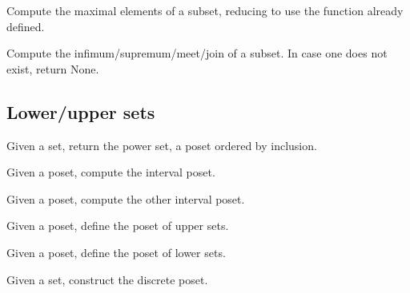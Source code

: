 \begin{exercise}
Compute the maximal elements of a subset, reducing
to use the function  already defined.


\end{exercise}


\begin{exercise}
Compute the infimum/supremum/meet/join of a subset.
In case one does not exist, return None.


\end{exercise}

\subsection{Lower/upper sets}
\begin{exercise}
Given a set, return the power set, a poset ordered by inclusion.

\end{exercise}


\begin{exercise}
Given a poset, compute the interval poset.

\end{exercise}


\begin{exercise}
Given a poset, compute the other interval poset.

\end{exercise}


\begin{exercise}
Given a poset, define the poset of upper sets.

\end{exercise}

\begin{exercise}
Given a poset, define the poset of lower sets.
\end{exercise}


\begin{exercise}
Given a set, construct the discrete poset.

\end{exercise}


